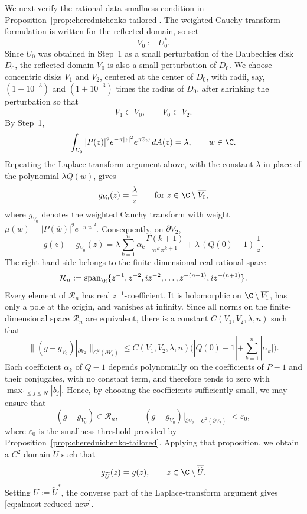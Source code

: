 We next verify the rational-data smallness condition in Proposition~\ref{prop:cherednichenko-tailored}. The weighted Cauchy transform formulation is written for the reflected domain, so set
\[
V_0:=U_0^\ast.
\]
Since \(U_0\) was obtained in Step~1 as a small perturbation of the Daubechies disk \(D_0\), the reflected domain \(V_0\) is also a small perturbation of \(D_0\). We choose concentric disks \(V_1\) and \(V_2\), centered at the center of \(D_0\), with radii, say, \((1-10^{-3})\) and \((1+10^{-3})\) times the radius of \(D_0\), after shrinking the perturbation so that
\[
\overline{V_1}\subset V_0,\qquad \overline{V_0}\subset V_2 .
\]
By Step~1,
\[
\int_{U_0}|P(z)|^2e^{-\pi|z|^2}e^{\pi \overline zw}\,dA(z)=\lambda,
\qquad w\in \C.
\]
Repeating the Laplace-transform argument above, with the constant $\lambda$ in place of the polynomial $\lambda Q(w)$, gives
\[
g_{V_0}(z)=\frac{\lambda}{z}
\qquad \text{for } z\in \C\setminus \overline{V_0},
\]
where \(g_{V_0}\) denotes the weighted Cauchy transform with weight \(\mu(w)=|P(\overline w)|^2e^{-\pi|w|^2}\). Consequently, on \(\partial V_2\),
\[
g(z)-g_{V_0}(z)
=
\lambda \sum_{k=1}^n \alpha_k \frac{\Gamma(k+1)}{\pi^k z^{k+1}}
+
\lambda\,(Q(0)-1)\,\frac1z .
\]
The right-hand side belongs to the finite-dimensional real rational space
\[
\mathcal R_n:=\operatorname{span}_{\R}
\{z^{-1},z^{-2},iz^{-2},\ldots,z^{-(n+1)},iz^{-(n+1)}\}.
\]
Every element of \(\mathcal R_n\) has real \(z^{-1}\)-coefficient. It is
holomorphic on \(\C\setminus\overline{V_1}\), has only a pole at the origin,
and vanishes at infinity. Since all norms on the finite-dimensional
space \(\mathcal R_n\) are equivalent, there is a constant
\(C(V_1,V_2,\lambda,n)\) such that
\[
\big\|(g-g_{V_0})|_{\partial V_2}\big\|_{C^2(\partial V_2)}
\le
C(V_1,V_2,\lambda,n)
\Big(|Q(0)-1|+\sum_{k=1}^n |\alpha_k|\Big).
\]
Each coefficient \(\alpha_k\) of \(Q-1\) depends polynomially on the
coefficients of \(P-1\) and their conjugates, with no constant term, and
therefore tends to zero with \(\max_{1\le j\le N}|b_j|\). Hence, by choosing
the coefficients sufficiently small, we may ensure that
\[
(g-g_{V_0})\in\mathcal R_n,
\qquad
\big\|(g-g_{V_0})|_{\partial V_2}\big\|_{C^2(\partial V_2)}<\varepsilon_0,
\]
where \(\varepsilon_0\) is the smallness threshold provided by Proposition~\ref{prop:cherednichenko-tailored}. Applying that proposition, we obtain a \(C^2\) domain \(\widetilde U\) such that
\[
g_{\widetilde U}(z)=g(z),
\qquad z\in \C\setminus \overline{\widetilde U}.
\]
Setting \(U:=\widetilde U^\ast\), the converse part of the Laplace-transform argument gives \eqref{eq:almost-reduced-new}.


